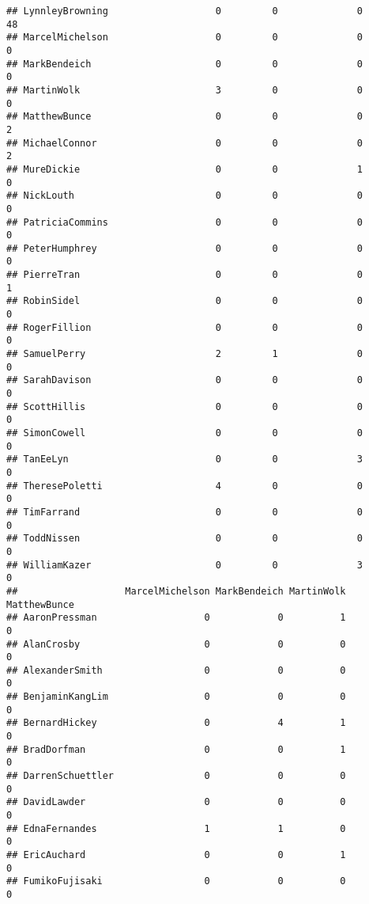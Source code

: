 \documentclass[
  12pt,
]{article}
\begin{document}
\begin{verbatim}
## LynnleyBrowning                   0         0              0              48
## MarcelMichelson                   0         0              0               0
## MarkBendeich                      0         0              0               0
## MartinWolk                        3         0              0               0
## MatthewBunce                      0         0              0               2
## MichaelConnor                     0         0              0               2
## MureDickie                        0         0              1               0
## NickLouth                         0         0              0               0
## PatriciaCommins                   0         0              0               0
## PeterHumphrey                     0         0              0               0
## PierreTran                        0         0              0               1
## RobinSidel                        0         0              0               0
## RogerFillion                      0         0              0               0
## SamuelPerry                       2         1              0               0
## SarahDavison                      0         0              0               0
## ScottHillis                       0         0              0               0
## SimonCowell                       0         0              0               0
## TanEeLyn                          0         0              3               0
## TheresePoletti                    4         0              0               0
## TimFarrand                        0         0              0               0
## ToddNissen                        0         0              0               0
## WilliamKazer                      0         0              3               0
##                   MarcelMichelson MarkBendeich MartinWolk MatthewBunce
## AaronPressman                   0            0          1            0
## AlanCrosby                      0            0          0            0
## AlexanderSmith                  0            0          0            0
## BenjaminKangLim                 0            0          0            0
## BernardHickey                   0            4          1            0
## BradDorfman                     0            0          1            0
## DarrenSchuettler                0            0          0            0
## DavidLawder                     0            0          0            0
## EdnaFernandes                   1            1          0            0
## EricAuchard                     0            0          1            0
## FumikoFujisaki                  0            0          0            0

\end{verbatim}
\end{document}
